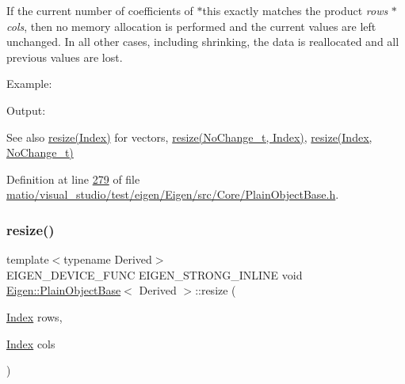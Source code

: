 If the current number of coefficients of {\ttfamily $\ast$this} exactly matches the product {\itshape rows} $\ast$ {\itshape cols}, then no memory allocation is performed and the current values are left unchanged. In all other cases, including shrinking, the data is reallocated and all previous values are lost.

Example\+: 
\begin{DoxyCodeInclude}
\end{DoxyCodeInclude}
 Output\+: 
\begin{DoxyVerbInclude}
\end{DoxyVerbInclude}


\begin{DoxySeeAlso}{See also}
\hyperlink{class_eigen_1_1_plain_object_base_abf8a9ec07cd52a2cdabb527596f7ddd1}{resize(\+Index)} for vectors, \hyperlink{class_eigen_1_1_plain_object_base_ab71a655f73d05a0e389e3ed13b6fe5f3}{resize(\+No\+Change\+\_\+t, Index)}, \hyperlink{class_eigen_1_1_plain_object_base_a7b44761b7350ae3756035bbf7d7c04f6}{resize(\+Index, No\+Change\+\_\+t)} 
\end{DoxySeeAlso}


Definition at line \hyperlink{matio_2visual__studio_2test_2eigen_2_eigen_2src_2_core_2_plain_object_base_8h_source_l00279}{279} of file \hyperlink{matio_2visual__studio_2test_2eigen_2_eigen_2src_2_core_2_plain_object_base_8h_source}{matio/visual\+\_\+studio/test/eigen/\+Eigen/src/\+Core/\+Plain\+Object\+Base.\+h}.

\mbox{\label{class_eigen_1_1_plain_object_base_a99d9054ee2d5a40c6e00ded0265e9cea}} 
\subsubsection{\texorpdfstring{resize()}{resize()}\hspace{0.1cm}{\footnotesize\ttfamily [2/8]}}
{\footnotesize\ttfamily template$<$typename Derived$>$ \\
E\+I\+G\+E\+N\+\_\+\+D\+E\+V\+I\+C\+E\+\_\+\+F\+U\+NC E\+I\+G\+E\+N\+\_\+\+S\+T\+R\+O\+N\+G\+\_\+\+I\+N\+L\+I\+NE void \hyperlink{class_eigen_1_1_plain_object_base}{Eigen\+::\+Plain\+Object\+Base}$<$ Derived $>$\+::resize (\begin{DoxyParamCaption}\item[{\hyperlink{namespace_eigen_a62e77e0933482dafde8fe197d9a2cfde}{Index}}]{rows,  }\item[{\hyperlink{namespace_eigen_a62e77e0933482dafde8fe197d9a2cfde}{Index}}]{cols }\end{DoxyParamCaption})\hspace{0.3cm}{\ttfamily [inline]}}

